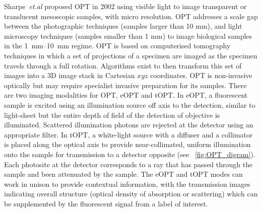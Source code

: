 Sharpe~\emph{et.al} proposed \gls{OPT} in 2002 \cite{sharpe_optical_2002}
using visible light to image transparent or translucent mesoscopic samples, with micro resolution.
\gls{OPT} addresses a scale gap between the photographic techniques (samples larger than 10 mm), and light microscopy techniques (samples smaller than 1 mm) to image biological samples in the \SIrange{1}{10}{\milli\meter} regime.
\gls{OPT} is based on computerised tomography techniques \cite{[17]} in which a set of projections of a specimen are imaged as the specimen travels through a full rotation.
Algorithms exist to then transform this set of images into a
\gls{3D} image stack in Cartesian \(xyz\) coordinates.
\gls{OPT} is non-invasive optically but may require specialist invasive preparation for its samples.
There are two imaging modalities for \gls{OPT}, \gls{eOPT} and \gls{tOPT}.
In \gls{eOPT}, a fluorescent sample is excited using an illumination source off axis to the detection, similar to \gls{light-sheet} but the entire \gls{depth of field} of the detection of objective is illuminated.
Scattered illumination photons are rejected at the detector using an appropriate filter.
In tOPT, a white-light source with a diffuser and a collimator is placed along the optical axis to provide near-collimated, uniform illumination onto the sample for transmission to a detector opposite (see \figurename~\ref{fig:OPT_digram}).
Each \gls{photosite} at the detector corresponds to a ray that has passed through the sample and been attenuated by the sample.
The \gls{eOPT} and \gls{tOPT} modes can work in unison to provide contextual information, with the transmission images indicating overall structure (optical density of absorption or scattering) which can be supplemented by the fluorescent signal from a label of interest.

